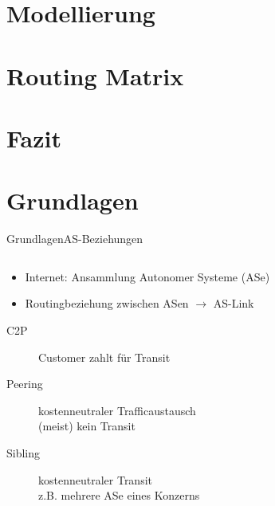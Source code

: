 \documentclass[ngerman,compress,hyperref={bookmarks}]{beamer}
\begin{document}
\section{Modellierung}

\section{Routing Matrix}

\section{Fazit}

\section{Grundlagen}
\begin{frame}[allowframebreaks]{Grundlagen}{AS-Beziehungen}
  \begin{columns}[c]
    \begin{column}{0.75\textwidth}
      \begin{itemize}
        \item Internet: Ansammlung Autonomer Systeme (ASe)
        \item Routingbeziehung zwischen ASen $\rightarrow$ AS-Link
      \end{itemize}
      \begin{description}
        \item[C2P] Customer zahlt für Transit
        \item[Peering] kostenneutraler Trafficaustausch\\{\scriptsize(meist) kein Transit}
        \item[Sibling] kostenneutraler Transit\\{\scriptsize z.B. mehrere ASe eines Konzerns}
      \end{description}
    \end{column}
    \begin{column}{0.25\textwidth}
      \begin{figure}

\end{figure}
\end{column}
\end{columns}
\end{frame}
\end{document}
